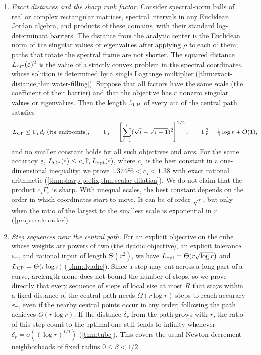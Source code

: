 \begin{enumerate}[leftmargin=*,label=\arabic*.]
\item \emph{Exact distances and the sharp rank factor.}
Consider spectral-norm balls of real or complex rectangular matrices,
spectral intervals in any Euclidean Jordan algebra, and products of
these domains, with their standard log-determinant barriers. The
distance from the analytic center is the Euclidean norm of the singular
values or eigenvalues after applying $\rho$ to each of them; paths that
rotate the spectral frame are not shorter. The squared distance
$L_{\mathrm{opt}}(\varepsilon)^2$ is the value of a strictly convex problem in the
spectral coordinates, whose solution is determined by a single Lagrange
multiplier (\cref{thm:exact-distance,thm:water-filling}).
Suppose that all factors have the same scale (the coefficient of their
barrier) and that the objective has $r$ nonzero singular values or
eigenvalues. Then the length $L_{\mathrm{CP}}$ of every arc of the central path
satisfies
\begin{equation}
 L_{\mathrm{CP}}\leq\Gamma_r d_F(\text{its endpoints}),\qquad
 \Gamma_r=\left[\sum_{i=1}^r(\sqrt i-\sqrt{i-1})^2\right]^{1/2},
 \qquad \Gamma_r^2=\tfrac14\log r+O(1),
 \label{eq:intro-Gamma}
\end{equation}
and no smaller constant holds for all such objectives and arcs.
For the same accuracy $\varepsilon$,
$L_{\mathrm{CP}}(\varepsilon)\leq c_\star\Gamma_r L_{\mathrm{opt}}(\varepsilon)$, where $c_\star$ is
the best constant in a one-dimensional inequality; we prove
$1.37486<c_\star<1.38$ with exact rational arithmetic
(\cref{thm:sharp-prefix,thm:scalar-dilation}). We do not claim that the
product $c_\star\Gamma_r$ is sharp. With unequal scales, the best
constant depends on the order in which coordinates start to move. It
can be of order $\sqrt r$, but only when the ratio of the largest to the
smallest scale is exponential in $r$ (\cref{prop:scale-order}).

\item \emph{Step sequences near the central path.}
For an explicit objective on the cube whose weights are powers of two
(the dyadic objective), an explicit tolerance $\varepsilon_r$, and rational input of
length $\Theta(r^2)$, we have $L_{\mathrm{opt}}=\Theta(r\sqrt{\log r})$ and
$L_{\mathrm{CP}}=\Theta(r\log r)$ (\cref{thm:dyadic}). Since a step may cut
across a long part of a curve, arclength alone does not bound the number
of steps, so we prove directly that every sequence of steps of
local size at most $R$ that stays within a fixed distance of the central
path needs $\Omega(r\log r)$ steps to reach accuracy $\varepsilon_r$, even if the
nearby central points occur in any order; following the path achieves
$O(r\log r)$. If the distance $\delta_r$ from the path grows with $r$, the ratio of
this step count to the optimal one still tends to infinity whenever
$\delta_r=o((\log r)^{1/3})$ (\cref{thm:tube}). This covers the usual
Newton-decrement neighborhoods of fixed radius $0\leq\beta<1/2$.


\end{enumerate}
